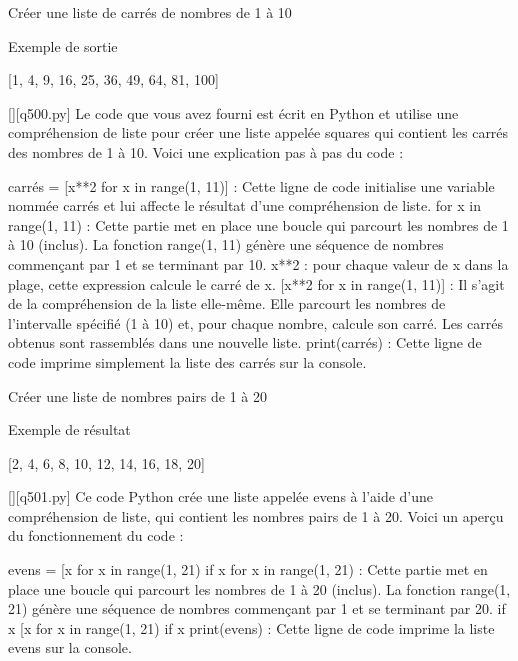 
        \question
        Créer une liste de carrés de nombres de 1 à 10

Exemple de sortie

[1, 4, 9, 16, 25, 36, 49, 64, 81, 100]
        \par
        \begin{solution}
            \renewcommand{\nomfichier}{q500.py}
            \pythonfile{\chemincode \nomfichier}[][\nomfichier]
            Le code que vous avez fourni est écrit en Python et utilise une compréhension de liste pour créer une liste appelée squares qui contient les carrés des nombres de 1 à 10. Voici une explication pas à pas du code :

    carrés = [x**2 for x in range(1, 11)] : Cette ligne de code initialise une variable nommée carrés et lui affecte le résultat d'une compréhension de liste.
        for x in range(1, 11) : Cette partie met en place une boucle qui parcourt les nombres de 1 à 10 (inclus). La fonction range(1, 11) génère une séquence de nombres commençant par 1 et se terminant par 10.
        x**2 : pour chaque valeur de x dans la plage, cette expression calcule le carré de x.
        [x**2 for x in range(1, 11)] : Il s'agit de la compréhension de la liste elle-même. Elle parcourt les nombres de l'intervalle spécifié (1 à 10) et, pour chaque nombre, calcule son carré. Les carrés obtenus sont rassemblés dans une nouvelle liste.
    print(carrés) : Cette ligne de code imprime simplement la liste des carrés sur la console.
        \end{solution}
        

        \question
        Créer une liste de nombres pairs de 1 à 20

Exemple de résultat

[2, 4, 6, 8, 10, 12, 14, 16, 18, 20]
        \par
        \begin{solution}
            \renewcommand{\nomfichier}{q501.py}
            \pythonfile{\chemincode \nomfichier}[][\nomfichier]
            Ce code Python crée une liste appelée evens à l'aide d'une compréhension de liste, qui contient les nombres pairs de 1 à 20. Voici un aperçu du fonctionnement du code :

    evens = [x for x in range(1, 21) if x %
        for x in range(1, 21) : Cette partie met en place une boucle qui parcourt les nombres de 1 à 20 (inclus). La fonction range(1, 21) génère une séquence de nombres commençant par 1 et se terminant par 20.
        if x %
        [x for x in range(1, 21) if x %
    print(evens) : Cette ligne de code imprime la liste evens sur la console.
        \end{solution}
        

